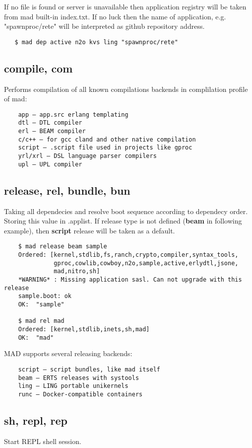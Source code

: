 If no file is found or server is unavailable then application registry will
be taken from mad built-in index.txt. If no luck then the name of application,
e.g. "spawnproc/rete" will be interpreted as github repository address.

\vspace{1\baselineskip}
\begin{lstlisting}
   $ mad dep active n2o kvs ling "spawnproc/rete"
\end{lstlisting}
\vspace{1\baselineskip}

\subsection{compile, com}
Performs compilation of all known compilations backends in complilation profile of mad:
\vspace{1\baselineskip}
\begin{lstlisting}
    app — app.src erlang templating
    dtl — DTL compiler
    erl — BEAM compiler
    c/c++ — for gcc cland and other native compilation
    script — .script file used in projects like gproc
    yrl/xrl — DSL language parser compilers
    upl — UPL compiler
\end{lstlisting}
\vspace{1\baselineskip}

\subsection{release, rel, bundle, bun}
Taking all dependecies and resolve boot sequence according to dependecy order.
Storing this value in .applist. If release type is not defined ({\bf beam} in following example),
then {\bf script} release will be taken as a default.
\vspace{1\baselineskip}
\begin{lstlisting}
    $ mad release beam sample
    Ordered: [kernel,stdlib,fs,ranch,crypto,compiler,syntax_tools,
              gproc,cowlib,cowboy,n2o,sample,active,erlydtl,jsone,
              mad,nitro,sh]
    *WARNING* : Missing application sasl. Can not upgrade with this release
    sample.boot: ok
    OK:  "sample"

    $ mad rel mad
    Ordered: [kernel,stdlib,inets,sh,mad]
    OK:  "mad"
\end{lstlisting}
\vspace{1\baselineskip}

MAD supports several releasing backends:

\vspace{1\baselineskip}
\begin{lstlisting}
    script — script bundles, like mad itself
    beam — ERTS releases with systools
    ling — LING portable unikernels
    runc — Docker-compatible containers
\end{lstlisting}
\vspace{1\baselineskip}

\subsection{sh, repl, rep}

Start REPL shell session.
